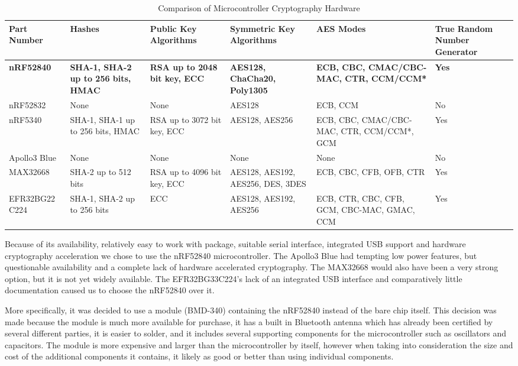 \begin{table}[!hb]
\centering
\begin{tabular}{>{\centering\arraybackslash}m{2.5cm}|
                >{\centering\arraybackslash}m{2.0cm}|
                >{\centering\arraybackslash}m{2.0cm}|
                >{\centering\arraybackslash}m{2.5cm}|
                >{\centering\arraybackslash}m{2.5cm}|
                >{\centering\arraybackslash}m{1.5cm}}
\toprule
Part Number & Hashes & Public Key Algorithms & Symmetric Key Algorithms & AES Modes & True Random Number Generator \\
\midrule
\textbf{nRF52840} & \textbf{SHA-1, SHA-2 up to 256 bits, HMAC} & \textbf{RSA up to 2048 bit key, ECC} & \textbf{AES128, ChaCha20, Poly1305} & \textbf{ECB, CBC, CMAC/CBC-MAC, CTR, CCM/CCM*} & \textbf{Yes} \\
nRF52832 & None & None & AES128 & ECB, CCM & No \\
nRF5340 & SHA-1, SHA-1 up to 256 bits, HMAC & RSA up to 3072 bit key, ECC & AES128, AES256 & ECB, CBC, CMAC/CBC-MAC, CTR, CCM/CCM*, GCM & Yes \\
Apollo3 Blue & None & None & None & None & No \\
MAX32668 & SHA-2 up to 512 bits & RSA up to 4096 bit key, ECC & AES128, AES192, AES256, DES, 3DES & ECB, CBC, CFB, OFB, CTR & Yes \\
EFR32BG22 C224 & SHA-1, SHA-2 up to 256 bits & ECC & AES128, AES192, AES256 & ECB, CTR, CBC, CFB, GCM, CBC-MAC, GMAC, CCM & Yes \\
\bottomrule
\end{tabular}
\caption{Comparison of Microcontroller Cryptography Hardware}
\label{tab:mcu-comp-crypto}
\end{table}

Because of its availability, relatively easy to work with package, suitable
serial interface, integrated USB support and hardware cryptography acceleration
we chose to use the nRF52840 microcontroller. The Apollo3 Blue had tempting low 
power features, but questionable availability and a complete lack of hardware 
accelerated cryptography. The MAX32668 would also have been a very strong 
option, but it is not yet widely available. The EFR32BG33C224's lack of an 
integrated USB interface and comparatively little documentation caused us to
choose the nRF52840 over it.

More specifically, it was decided to use a module (BMD-340) containing the
nRF52840 instead of the bare chip itself. This decision was made because 
the module is much more available for purchase, it has a built in Bluetooth 
antenna which has already been certified by several different parties, it is 
easier to solder, and it includes several supporting components for the 
microcontroller such as oscillators and capacitors. The module is more 
expensive and larger than the microcontroller by itself, however when taking 
into consideration the size and cost of the additional components it contains, 
it likely as good or better than using individual components.

